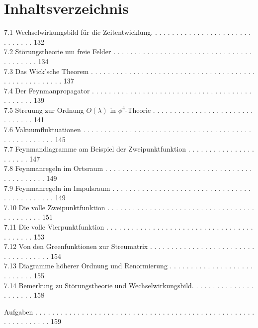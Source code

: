 \documentclass[10pt, letterpaper]{article}
\begin{document}
\section*{Inhaltsverzeichnis}
7.1 Wechselwirkungsbild für die Zeitentwicklung. . . . . . . . . . . . . . . . . . . . . . . . . . . . . . . 132\\
7.2 Störungstheorie um freie Felder . . . . . . . . . . . . . . . . . . . . . . . . . . . . . . . . . . . . . . . . . 134\\
7.3 Das Wick'sche Theorem . . . . . . . . . . . . . . . . . . . . . . . . . . . . . . . . . . . . . . . . . . . . . . . . . . . . . 137\\
7.4 Der Feynmanpropagator . . . . . . . . . . . . . . . . . . . . . . . . . . . . . . . . . . . . . . . . . . . . . 139\\
7.5 Streuung zur Ordnung $O(\lambda)$ in $\phi^{4}$-Theorie . . . . . . . . . . . . . . . . . . . . . . . . . . . . . . . 141\\
7.6 Vakuumfluktuationen . . . . . . . . . . . . . . . . . . . . . . . . . . . . . . . . . . . . . . . . . . . . . . . . . . . . 145\\
7.7 Feynmandiagramme am Beispiel der Zweipunktfunktion . . . . . . . . . . . . . . . . . . . . . . 147\\
7.8 Feynmanregeln im Ortsraum . . . . . . . . . . . . . . . . . . . . . . . . . . . . . . . . . . . . . . . . . . . . . 149\\
7.9 Feynmanregeln im Impulsraum . . . . . . . . . . . . . . . . . . . . . . . . . . . . . . . . . . . . . . . . . . . . . 149\\
7.10 Die volle Zweipunktfunktion . . . . . . . . . . . . . . . . . . . . . . . . . . . . . . . . . . . . . . . . . . . . 151\\
7.11 Die volle Vierpunktfunktion . . . . . . . . . . . . . . . . . . . . . . . . . . . . . . . . . . . . . . . . . . 153\\
7.12 Von den Greenfunktionen zur Streumatrix . . . . . . . . . . . . . . . . . . . . . . . . . . . . . . . . . . . . 154\\
7.13 Diagramme höherer Ordnung und Renormierung . . . . . . . . . . . . . . . . . . . . . . . . . . . 155\\
7.14 Bemerkung zu Störungstheorie und Wechselwirkungsbild. . . . . . . . . . . . . . . . . . . . . . 158

Aufgaben . . . . . . . . . . . . . . . . . . . . . . . . . . . . . . . . . . . . . . . . . . . . . . . . . . . . . . . . . . . . . . . 159
\end{document}

